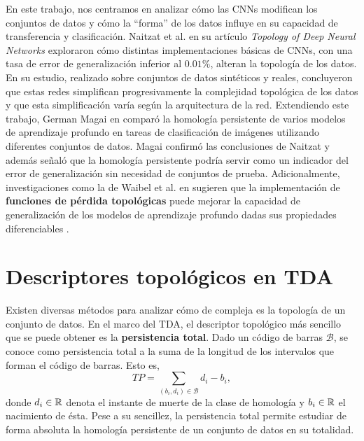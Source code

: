 En este trabajo, nos centramos en analizar cómo las CNNs modifican los conjuntos
de datos y cómo la \enquote{forma} de los datos influye en su capacidad de
transferencia y clasificación. Naitzat et al. en su artículo \textit{Topology of
	Deep Neural Networks} \cite{naitzat2020topology} exploraron cómo distintas implementaciones
básicas de CNNs, con una tasa de error de generalización inferior al $0.01\%$, alteran
la topología de los datos. En su estudio, realizado sobre conjuntos de datos sintéticos
y reales, concluyeron que estas redes simplifican progresivamente la complejidad
topológica de los datos y que esta simplificación varía según la arquitectura de
la red. Extendiendo este trabajo, German Magai en \cite{magai2023deep} comparó
la homología persistente de varios modelos de aprendizaje profundo en tareas de
clasificación de imágenes utilizando diferentes conjuntos de datos. Magai confirmó
las conclusiones de Naitzat y además señaló que la homología persistente podría servir
como un indicador del error de generalización sin necesidad de conjuntos de prueba.
Adicionalmente, investigaciones como la de Waibel et al. en
\cite{waibel2022capturing} sugieren que la implementación de \textbf{funciones
	de pérdida topológicas} puede mejorar la capacidad de generalización de los modelos
de aprendizaje profundo dadas sus propiedades diferenciables \cite{leygonie2021frameworkdifferentialcalculuspersistence}. %

\section{Descriptores topológicos en TDA}

Existen diversas métodos para analizar cómo de compleja es la topología de un conjunto
de datos. En el marco del TDA, el descriptor topológico más sencillo que se puede
obtener es la \textbf{persistencia total}. Dado un código de barras $\mathcal{B}$,
se conoce como persistencia total a la suma de la longitud de los intervalos que
forman el código de barras. Esto es,
\[
TP = \sum_{(b_i,d_i) \in \mathcal{B}}d_{i} - b_{i},
\]
donde $d_{i} \in \mathbb{R}$ denota el instante de muerte de la clase de homología y
$b_{i} \in \mathbb{R}$ el nacimiento de ésta. Pese a su sencillez, la persistencia total
permite estudiar de forma absoluta la homología persistente de un conjunto de
datos en su totalidad.

